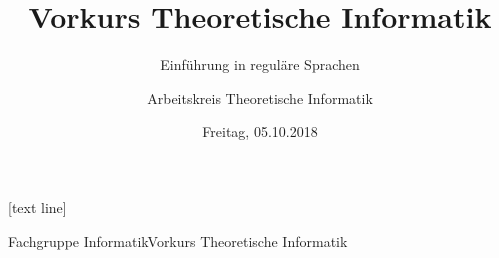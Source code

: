 \usepackage{appendixnumberbeamer}
\usepackage[ngerman]{babel}
\usepackage{booktabs}
\usepackage[scale=2]{ccicons}
\usepackage{hyperref}

\usepackage{pgfplots}

\usepackage{xspace}
\newcommand{\themename}{\textbf{\textsc{metropolis}}\xspace}

\usepackage{blindtext}
\usepackage{graphicx}
\usepackage{comment}
\usepackage{mathtools}
\usepackage{amsmath}
\usepackage{amssymb}
\usepackage{proof}
\usepackage{tabularx}
\renewcommand{\figurename}{Abb.}
\usepackage{marvosym}
\usepackage{pgf}
\usepackage{tikz}
\usetikzlibrary{arrows,automata}

\newcommand{\emptyWord}{\varepsilon}
\newcommand{\SigmaStern}{\Sigma^{*}}
\newcommand{\absval}[1]{|#1|}

\newcommand{\naturals}{\ensuremath{\mathbb{N}}}
\newcommand{\integers}{\ensuremath{\mathbb{Z}}}
\newcommand{\rationals}{\ensuremath{\mathbb{Q}}}
\newcommand{\reals}{\ensuremath{\mathbb{R}}}

[text line] 
{\parbox{\linewidth}{Fachgruppe Informatik\hfill\insertpagenumber\hfill Vorkurs Theoretische Informatik\vspace{0.2in}}}




\title{Vorkurs Theoretische Informatik}
\subtitle{Einführung in reguläre Sprachen}
\date{Freitag, 05.10.2018}
\author{Arbeitskreis Theoretische Informatik}
